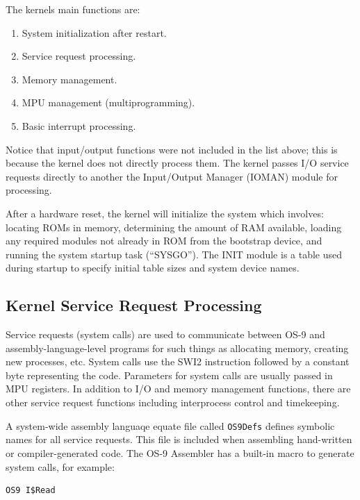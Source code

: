 \documentclass[
]{article}
\begin{document}
The kernel\textquotesingle s main functions are:

\begin{enumerate}
\def\labelenumi{\arabic{enumi}.}
\item
  System initialization after restart.
\item
  Service request processing.
\item
  Memory management.
\item
  MPU management (multiprogramming).
\item
  Basic interrupt processing.
\end{enumerate}

Notice that input/output functions were not included in the list above;
this is because the kernel does not directly process them. The kernel
passes I/O service requests directly to another the Input/Output Manager
(IOMAN) module for processing.

After a hardware reset, the kernel will initialize the system which
involves: locating ROMs in memory, determining the amount of RAM
available, loading any required modules not already in ROM from the
bootstrap device, and running the system startup task (``SYSGO''). The
INIT module is a table used during startup to specify initial table
sizes and system device names.

\subsection{Kernel Service Request Processing}

Service requests (system calls) are used to communicate between OS-9 and
assembly-language-level programs for such things as allocating memory,
creating new processes, etc. System calls use the SWI2 instruction
followed by a constant byte representing the code. Parameters for system
calls are usually passed in MPU registers. In addition to I/O and memory
management functions, there are other service request functions
including interprocess control and timekeeping.

A system-wide assembly languaqe equate file called \texttt{OS9Defs}
defines symbolic names for all service requests. This file is included
when assembling hand-written or compiler-generated code. The OS-9
Assembler has a built-in macro to generate system calls, for example:

\begin{verbatim}
OS9 I$Read
\end{verbatim}
\end{document}
